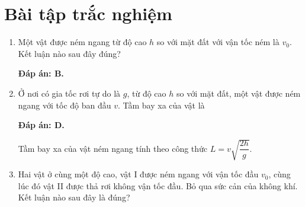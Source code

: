 \let\lesson\undefined
\newcommand{\lesson}{\phantomlesson{Bài 9.}}
\setcounter{section}{2}
\section{Bài tập trắc nghiệm}
\begin{enumerate}[label=\bfseries Câu \arabic*:,leftmargin=1.5cm]
	\item {}
	
	
	{Một vật được ném ngang từ độ cao $h$ so với mặt đất với vận tốc ném là $v_0$. Kết luận nào sau đây đúng?
	}
	
	\hideall
	{	\textbf{Đáp án: B.}
	}
	
	\item {}
	
	
	{Ở nơi có gia tốc rơi tự do là $g$, từ độ cao $h$ so với mặt đất, một vật được ném ngang với tốc độ ban đầu $v$. Tầm bay xa của vật là
	}
	
	\hideall
	{	\textbf{Đáp án: D.}
		
		Tầm bay xa của vật ném ngang tính theo công thức $L=v\sqrt{\dfrac{2h}{g}}$.
	}
	\item {}
	
	
	{Hai vật ở cùng một độ cao, vật I được ném ngang với vận tốc đầu $v_0$, cùng lúc đó vật II được thả rơi không vận tốc đầu. Bỏ qua sức cản của không khí. Kết luận nào sau đây là đúng?
	}
	

\end{enumerate}
